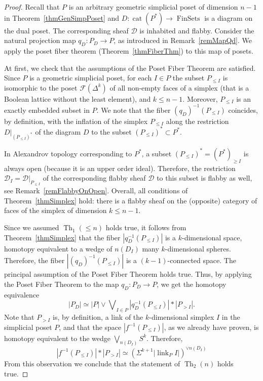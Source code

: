 \documentclass[english,12pt,oneside]{amsproc}
\DeclareMathOperator{\cat}{cat}
\DeclareMathOperator{\FinSets}{FinSets}
\DeclareMathOperator{\link}{link}
\DeclareMathOperator{\Th}{Th}
\newcommand{\ca}[1]{\mathcal{#1}}
\numberwithin{equation}{section}
\theoremstyle{plain}
\theoremstyle{definition}
\theoremstyle{remark}
\begin{document}
\begin{proof}
Recall that $P$ is an arbitrary geometric simplicial poset of dimension $n-1$ in Theorem~\ref{thmGenSimpPoset} and $D\colon \cat(P^*)\to \FinSets$ is a diagram on the dual poset. The corresponding sheaf $\ca{D}$ is inhabited and flabby. Consider the natural projection map $q_D\colon P_D\to P$, as introduced in Remark~\ref{remMapQd}. We apply the poset fiber theorem (Theorem~\ref{thmFiberThm}) to this map of posets.

At first, we check that the assumptions of the Poset Fiber Theorem are satisfied. Since $P$ is a geometric simplicial poset, for each $I\in P$ the subset $P_{\leqslant I}$ is isomorphic to the poset $\ca{F}(\Delta^{k})$ of all non-empty faces of a simplex (that is a Boolean lattice without the least element),  and  $k\leqslant n-1$. Moreover, $P_{\leqslant I}$ is an exactly embedded subset in $P$. We note that the fiber $(q_D)^{-1}(P_{\leqslant I})$ coincides, by definition, with the inflation of the simplex $P_{\leqslant I}$ along the restriction $D|_{(P_{\leqslant I})^*}$ of the diagram $D$ to the subset $(P_{\leqslant I})^*\subset P^*$.

In Alexandrov topology corresponding to $P^*$, a subset $(P_{\leqslant I})^*=(P^*)_{\geqslant I}$ is always open (because it is an upper order ideal). Therefore, the restriction $\ca{D}_I=\ca{D}|_{P_{\leqslant I}}$ of the corresponding flabby sheaf $\ca{D}$ to this subset is flabby as well, see Remark~\ref{remFlabbyOnOpen}. Overall, all conditions of Theorem~\ref{thmSimplex} hold: there is a flabby sheaf on the (opposite) category of faces of the simplex of dimension $k\leqslant n-1$.

Since we assumed $\Th_1(\leqslant n)$ holds true, it follows from Theorem~\ref{thmSimplex} that the fiber $|q_D^{-1}(P_{\leqslant I})|$ is a $k$-dimensional space, homotopy equivalent to a wedge of $n(D_I)$ many $k$-dimensional spheres. Therefore, the fiber $|(q_D)^{-1}(P_{\leqslant I})|$ is a $(k-1)$-connected space. The principal assumption of the Poset Fiber Theorem holds true. Thus, by applying the Poset Fiber Theorem to the map $q_D\colon P_D\to P$, we get the homotopy equivalence
\begin{equation}
|P_D|\simeq |P|\vee\bigvee\nolimits_{I\in P} |q_D^{-1}(P_{\leqslant I})|\ast |P_{>I}|.
\end{equation}
Note that $P_{>I}$ is, by definition, a link of the $k$-dimensional simplex $I$ in the simplicial poset $P$, and that the space $|f^{-1}(P_{\leqslant I})|$, as we already have proven, is homotopy equivalent to the wedge $\bigvee_{n(D_I)}S^k$. Therefore,
\[
|f^{-1}(P_{\leqslant I})|\ast |P_{>I}|\simeq (\Sigma^{k+1}|\link_PI|)^{\vee n(D_I)}
\]
From this observation we conclude that the statement of $\Th_2(n)$ holds true.
\end{proof}
\end{document}
